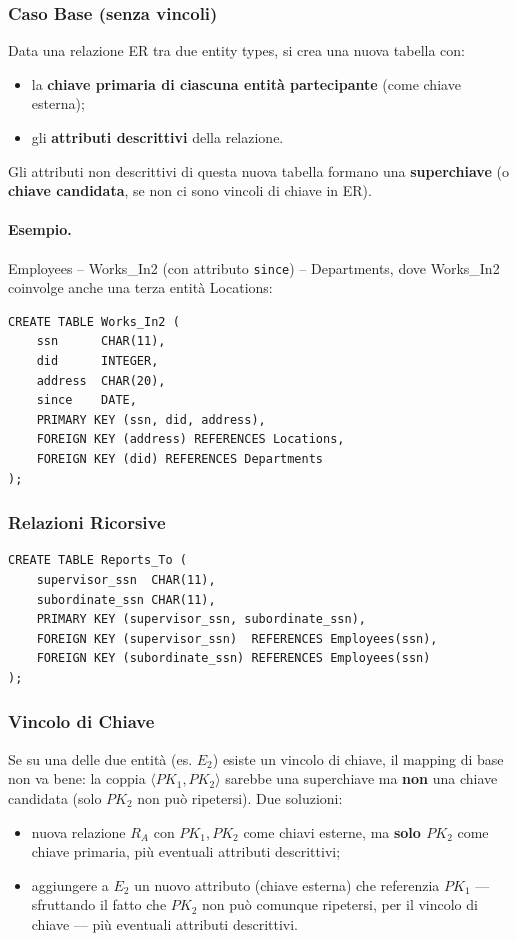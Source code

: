 \documentclass[12pt, a4paper]{article}
\begin{document}
\subsubsection{Caso Base (senza vincoli)}
Data una relazione ER tra due entity types, si crea una nuova tabella con:
\begin{itemize}
    \item la \textbf{chiave primaria di ciascuna entità partecipante} (come chiave esterna);
    \item gli \textbf{attributi descrittivi} della relazione.
\end{itemize}
Gli attributi non descrittivi di questa nuova tabella formano una \textbf{superchiave} (o \textbf{chiave candidata}, se non ci sono vincoli di chiave in ER).

\paragraph{Esempio.} Employees – Works\_In2 (con attributo \texttt{since}) – Departments, dove Works\_In2 coinvolge anche una terza entità Locations:
\begin{verbatim}
CREATE TABLE Works_In2 (
    ssn      CHAR(11),
    did      INTEGER,
    address  CHAR(20),
    since    DATE,
    PRIMARY KEY (ssn, did, address),
    FOREIGN KEY (address) REFERENCES Locations,
    FOREIGN KEY (did) REFERENCES Departments
);
\end{verbatim}

\subsubsection{Relazioni Ricorsive}
\begin{verbatim}
CREATE TABLE Reports_To (
    supervisor_ssn  CHAR(11),
    subordinate_ssn CHAR(11),
    PRIMARY KEY (supervisor_ssn, subordinate_ssn),
    FOREIGN KEY (supervisor_ssn)  REFERENCES Employees(ssn),
    FOREIGN KEY (subordinate_ssn) REFERENCES Employees(ssn)
);
\end{verbatim}

\subsubsection{Vincolo di Chiave}
Se su una delle due entità (es. $E_2$) esiste un vincolo di chiave, il mapping di base non va bene: la coppia $\langle PK_1,PK_2\rangle$ sarebbe una superchiave ma \textbf{non} una chiave candidata (solo $PK_2$ non può ripetersi). Due soluzioni:
\begin{itemize}
    \item[\textbf{A.}] nuova relazione $R_A$ con $PK_1, PK_2$ come chiavi esterne, ma \textbf{solo $PK_2$} come chiave primaria, più eventuali attributi descrittivi;
    \item[\textbf{B.}] aggiungere a $E_2$ un nuovo attributo (chiave esterna) che referenzia $PK_1$ — sfruttando il fatto che $PK_2$ non può comunque ripetersi, per il vincolo di chiave — più eventuali attributi descrittivi.
\end{itemize}
\end{document}
